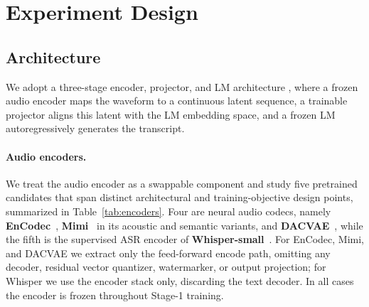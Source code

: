 %

\section{Experiment Design}

\label{sec:methodology}

\subsection{Architecture}
\label{sec:method:arch}

We adopt a three-stage encoder, projector, and LM architecture \cite{FLM25,SLAM24}, where a frozen audio encoder maps the waveform to a continuous latent sequence, a trainable projector aligns this latent with the LM embedding space, and a frozen LM autoregressively generates the transcript.

\paragraph{Audio encoders.}
We treat the audio encoder as a swappable component and study five pretrained candidates that span distinct architectural and training-objective design points, summarized in Table~\ref{tab:encoders}.
Four are neural audio codecs, namely \textbf{EnCodec}~\cite{Df22}, \textbf{Mimi}~\cite{Mi24} in its acoustic and semantic variants, and \textbf{DACVAE}~\cite{DAC23,AS24}, while the fifth is the supervised ASR encoder of \textbf{Whisper-small}~\cite{Wh23}.
For EnCodec, Mimi, and DACVAE we extract only the feed-forward encode path, omitting any decoder, residual vector quantizer, watermarker, or output projection; for Whisper we use the encoder stack only, discarding the text decoder.
In all cases the encoder is frozen throughout Stage-1 training.

